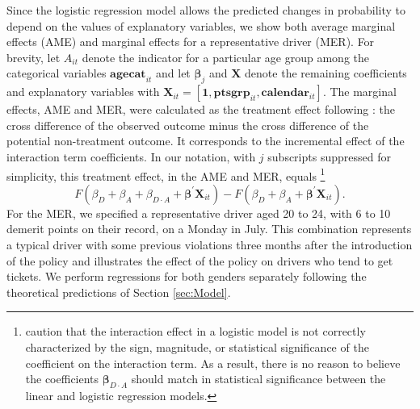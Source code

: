 Since the logistic regression model allows the predicted changes in probability to depend on
the values of explanatory variables, 
we show both average marginal effects (AME)
and marginal effects for a representative driver (MER). 
% 
% 
For brevity, let $A_{it}$ denote the indicator for a particular age group 
among the categorical variables $\bm{agecat}_{it}$
and let $\bm{\beta}_j$ and $\bm{X}$ denote 
the remaining coefficients and explanatory variables 
with $\bm{X}_{it} = [\bm{1}, \bm{ptsgrp}_{it}, \bm{calendar}_{it}]$. 
% 
The marginal effects, AME and MER, 
were calculated as the treatment effect following \citet{puhani2012}:
the cross difference of the observed outcome 
minus the cross difference of the potential non-treatment outcome. It corresponds to the incremental effect of the interaction term coefficients. 
In our notation, with $j$ subscripts suppressed for simplicity, 
this treatment effect, in the AME and MER, equals%
% 
\footnote{
\citet{ainorton2003} caution that 
the interaction effect in a logistic model 
is not correctly characterized by the
sign, magnitude, or statistical significance of the coefficient on the
interaction term.
%
As a result, there is no reason to believe the coefficients $\bm{\beta}_{D\cdot A}$
should match in statistical significance between the 
linear and logistic regression models. 
}
%
$$
	F(\beta_D + \beta_A + \beta_{D\cdot A} + \bm{\beta}^\prime \bm{X}_{it})
		- F(\beta_D + \beta_A + \bm{\beta}^\prime \bm{X}_{it}).
$$
% 
For the MER, 
we specified a representative driver aged 20 to 24, 
with 6 to 10 demerit points on their record, 
on a Monday in July.
This combination represents a typical driver with some previous violations 
three months after the introduction of the policy and illustrates 
the effect of the policy on drivers who tend to get tickets.  We perform regressions for both genders separately following the theoretical predictions of Section \ref{sec:Model}.



